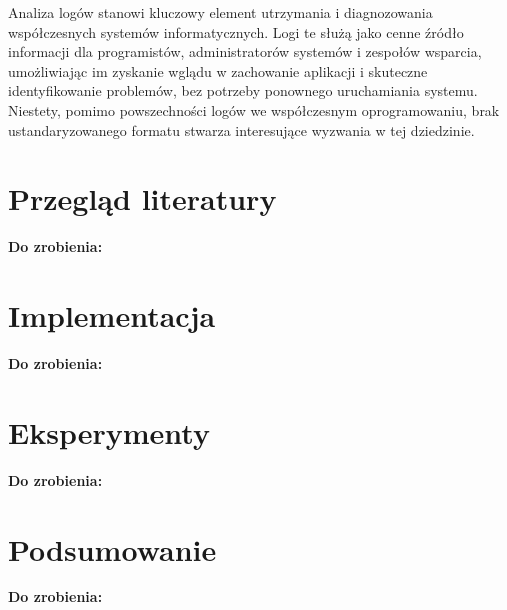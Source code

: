 \documentclass{pginz}
\newcommand{\todo}[1]{\textbf{Do zrobienia: } #1}
\begin{document}
Analiza logów stanowi kluczowy element utrzymania i diagnozowania współczesnych
systemów informatycznych. Logi te służą jako cenne źródło informacji dla
programistów, administratorów systemów i zespołów wsparcia, umożliwiając im
zyskanie wglądu w zachowanie aplikacji i skuteczne identyfikowanie problemów,
bez potrzeby ponownego uruchamiania systemu.
Niestety, pomimo powszechności logów we współczesnym oprogramowaniu, brak
ustandaryzowanego formatu stwarza interesujące wyzwania w tej dziedzinie.

\chapter{Przegląd literatury}

\todo{}

\chapter{Implementacja}

\todo{}

\chapter{Eksperymenty}

\todo{}

\chapter{Podsumowanie}

\todo{}

\listoffigures
{}
\listoftables
{}


\printbibliography[
    heading=bibintoc,
    title={Bibliografia}
]
\end{document}
